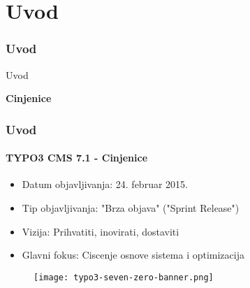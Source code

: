 %

\section{Uvod}
\begin{frame}[fragile]
	\frametitle{Uvod}

	\begin{center}\huge{Uvod}\end{center}
	\begin{center}\huge{\color{typo3darkgrey}\textbf{Cinjenice}}\end{center}

\end{frame}


\begin{frame}[fragile]
	\frametitle{Uvod}
	\framesubtitle{TYPO3 CMS 7.1 - Cinjenice}

	\begin{itemize}
		\item Datum objavljivanja: 24. februar 2015.
		\item Tip objavljivanja: "Brza objava" ("Sprint Release")
		\item Vizija: Prihvatiti, inovirati, dostaviti
		\item Glavni fokus: Ciscenje osnove sistema i optimizacija
	\end{itemize}

	\begin{figure}
		\texttt{[image: typo3-seven-zero-banner.png]}
	\end{figure}

\end{frame}

